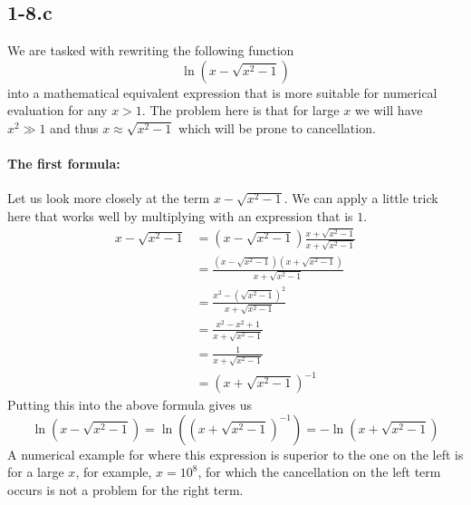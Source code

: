 \documentclass{article}
\begin{document}
\subsection*{1-8.c} We are tasked with rewriting the following function
\begin{equation*}
    \ln\left(x - \sqrt{x^{2}-1}\right)
\end{equation*}
into a mathematical equivalent expression that is more suitable for numerical evaluation for any $x > 1$. The problem here is that for large $x$ we will have $x^{2} \gg 1$ and thus $x \approx \sqrt{x^{2}-1}$ which will be prone to cancellation.

\paragraph{The first formula: }Let us look more closely at the term $x - \sqrt{x^{2} - 1}$. We can apply a little trick here that works well by multiplying with an expression that is $1$.
\begin{align*}
    x - \sqrt{x^{2}-1} &= \left(x - \sqrt{x^{2}-1}\right)\frac{x+ \sqrt{x^{2}-1}}{x + \sqrt{x^{2}-1}} \\[1mm]
    &= \frac{\left( x - \sqrt{x^{2}-1}\right)\left(x+ \sqrt{x^{2}-1}\right)}{x + \sqrt{x^{2}-1}}  \\[1mm]
    &= \frac{x^{2} - \left(\sqrt{x^{2}-1}\right)^{2}}{x+\sqrt{x^{2}-1}} \\[1mm]
    &= \frac{x^{2} - x^{2}+1}{x+\sqrt{x^{2}-1}} \\[1mm]
    &= \frac{1}{x+\sqrt{x^{2}-1}} \\
    &= \left(x+\sqrt{x^{2}-1}\right)^{-1}
\end{align*}
Putting this into the above formula gives us
\begin{equation*}
    \ln\left(x-\sqrt{x^{2}-1}\right) = \ln\left(\left(x+\sqrt{x^{2}-1}\right)^{-1}\right) = - \ln\left(x+\sqrt{x^{2}-1}\right)
\end{equation*}
A numerical example for where this expression is superior to the one on the left is for a large $x$, for example, $x=10^{8}$, for which the cancellation on the left term occurs is not a problem for the right term.
\end{document}
